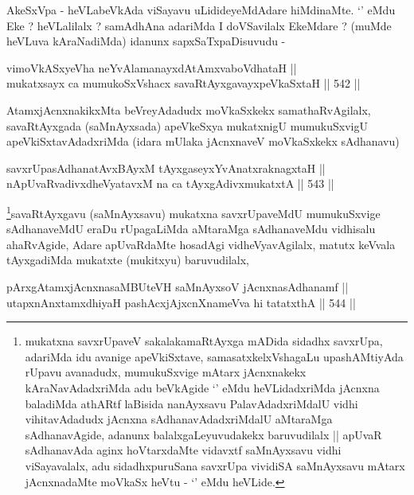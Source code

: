 \begin{artha}
AkeSxVpa - heVLabeVkAda viSayavu uLidideyeMdAdare hiMdinaMte. `\stext'
eMdu Eke ? heVLalilalx ? samAdhAna adariMda I doVSavilalx EkeMdare ?
(muMde heVLuva kAraNadiMda) idanunx sapxSaTxpaDisuvudu -
\end{artha}

\begin{shl}
vimoVkASxyeVha neYvAlamanayxdAtAmxvaboVdhataH || \\
mukatxsayx ca mumukoSxVshacx savaRtAyxgavayxpeVkaSxtaH ||  542 ||  
\end{shl}

\begin{artha}
AtamxjAcnxnakikxMta beVreyAdadudx moVkaSxkekx samathaRvAgilalx,
savaRtAyxgada (saMnAyxsada) apeVkeSxya mukatxnigU mumukuSxvigU
apeVkiSxtavAdadxriMda (idara mUlaka jAcnxnaveV moVkaSxkekx sAdhanavu)
\end{artha}


\begin{shl}
savxrUpasAdhanatAvxBAyxM tAyxgaseyxYvAnatxraknagxtaH || \\
nApUvaRvadivxdheVyatavxM na ca tAyxgAdivxmukatxtA ||  543 ||  
\end{shl}

\begin{artha}
\footnote{mukatxna savxrUpaveV sakalakamaRtAyxga mADida sidadhx
  savxrUpa, adariMda idu avanige apeVkiSxtave, samasatxkelxVshagaLu
  upashAMtiyAda rUpavu avanadudx, mumukuSxvige mAtarx jAcnxnakekx
  kAraNavAdadxriMda adu beVkAgide `\stext' eMdu heVLidadxriMda jAcnxna
  baladiMda athARtf laBisida nanAyxsavu PalavAdadxriMdalU vidhi
  vihitavAdadudx jAcnxna sAdhanavAdadxriMdalU aMtaraMga sAdhanavAgide,
  adanunx balalxgaLeyuvudakekx baruvudilalx || apUvaR sAdhanavAda
  aginx hoVtarxdaMte vidavxtf saMnAyxsavu vidhi viSayavalalx, adu
  sidadhxpuruSana savxrUpa vividiSA saMnAyxsavu mAtarx jAcnxnadaMte
  moVkaSx heVtu - `\stext' eMdu heVLide.}savaRtAyxgavu (saMnAyxsavu) mukatxna savxrUpaveMdU
mumukuSxvige sAdhanaveMdU eraDu rUpagaLiMda aMtaraMga sAdhanaveMdu
vidhisalu ahaRvAgide, Adare apUvaRdaMte hosadAgi vidheVyavAgilalx,
matutx keVvala tAyxgadiMda mukatxte (mukitxyu) baruvudilalx, 
\end{artha}

\begin{shl}
pArxgAtamxjAcnxnasaMBUteVH saMnAyxsoV jAcnxnasAdhanamf || \\
utapxnAnxtamxdhiyaH pashAcxjAjxcnXnameVva hi tatatxthA ||  544 ||  
\end{shl}

